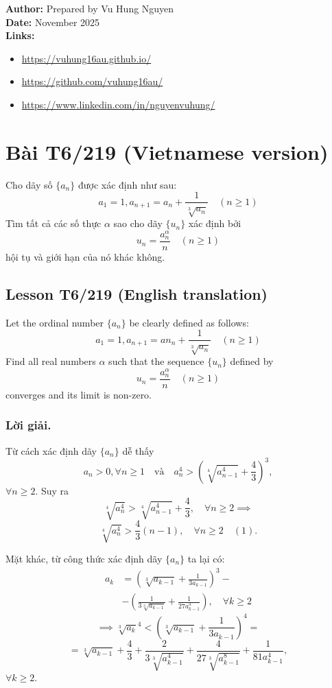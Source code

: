 \documentclass{article}
\author{Prepared by Vu Hung Nguyen}
\date{November 2025}
\begin{document}
\noindent\textbf{Author:} Prepared by Vu Hung Nguyen \\
\textbf{Date:} November 2025 \\
\vspace{0.3cm}
\textbf{Links:}
\begin{itemize}
    \item \href{https://vuhung16au.github.io/}{https://vuhung16au.github.io/}
    \item \href{https://github.com/vuhung16au/}{https://github.com/vuhung16au/}
    \item \href{https://www.linkedin.com/in/nguyenvuhung/}{https://www.linkedin.com/in/nguyenvuhung/}
\end{itemize}

\vspace{0.5cm}

\section{Bài T6/219 (Vietnamese version)} 

Cho dãy số $\{a_n\}$ được xác định như sau:
$$ a_1 = 1, a_{n+1} = a_n + \frac{1}{\sqrt[3]{a_n}} \quad (n \ge 1) $$
Tìm tất cả các số thực $\alpha$ sao cho dãy $\{u_n\}$ xác định bởi
$$ u_n = \frac{a_n^\alpha}{n} \quad (n \ge 1) $$
hội tụ và giới hạn của nó khác không.

\subsection{Lesson T6/219 (English translation)}

Let the ordinal number $\{a_n\}$ be clearly defined as follows:
$$ a_1 = 1, a_{n+1} = an_n + \frac{1}{\sqrt[3]{a_n}} \quad (n \ge 1) $$
Find all real numbers $\alpha$ such that the sequence $\{u_n\}$ defined by
$$ u_n = \frac{a_n^\alpha}{n} \quad (n \ge 1) $$
converges and its limit is non-zero.

\subsubsection*{Lời giải.}
Từ cách xác định dãy $\{a_n\}$ dễ thấy
$$ a_n > 0, \forall n \ge 1 \quad \text{và} \quad a_n^4 > \left(\sqrt[4]{a_{n-1}^4} + \frac{4}{3}\right)^3, $$
$\forall n \ge 2$. Suy ra
$$ \sqrt[4]{a_n^4} > \sqrt[4]{a_{n-1}^4} + \frac{4}{3}, \quad \forall n \ge 2 \implies $$
$$ \sqrt[4]{a_n^4} > \frac{4}{3}(n-1), \quad \forall n \ge 2 \quad (1). $$

Mặt khác, từ công thức xác định dãy $\{a_n\}$ ta lại có:
\begin{align*} a_k &= \left(\sqrt[3]{a_{k-1}} + \frac{1}{3a_{k-1}}\right)^3 - \\
&- \left(\frac{1}{3\sqrt[3]{a_{k-1}}} + \frac{1}{27a_{k-1}^3}\right), \quad \forall k \ge 2 \end{align*}
$$\implies \sqrt[3]{a_k}^4 < \left(\sqrt[3]{a_{k-1}} + \frac{1}{3 a_{k-1}}\right)^4 = $$
$$ = \sqrt[3]{a_{k-1}} + \frac{4}{3} + \frac{2}{3\sqrt[3]{a_{k-1}^4}} + \frac{4}{27\sqrt[3]{a_{k-1}^8}} + \frac{1}{81a_{k-1}^4}, $$
$\forall k \ge 2$.
\end{document}
